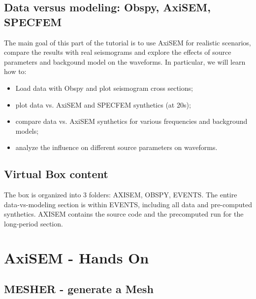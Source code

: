 \documentclass{article}
\begin{document}
\subsection{Data versus modeling: Obspy, AxiSEM, SPECFEM}
The main goal of this part of the tutorial is to use AxiSEM for realistic scenarios, compare the 
results with real seismograms and explore the effects of source parameters and 
backgound model on the waveforms. In particular, we will learn how to:

\begin{itemize}
    \item Load data with Obspy and plot seismogram cross sections;
    \item plot data vs. AxiSEM and SPECFEM synthetics (at 20s);
    \item compare data vs. AxiSEM synthetics for various frequencies and background
          models;
    \item analyze the influence on different source parameters on waveforms.
\end{itemize}


\subsection{Virtual Box content}
The box is organized into 3 folders: AXISEM, OBSPY, EVENTS. The entire
data-vs-modeling section is within EVENTS, including all data and pre-computed
synthetics. AXISEM contains the source code and the precomputed run
for the long-period section.



\section{AxiSEM - Hands On}

\subsection{MESHER - generate a Mesh}
\end{document}
